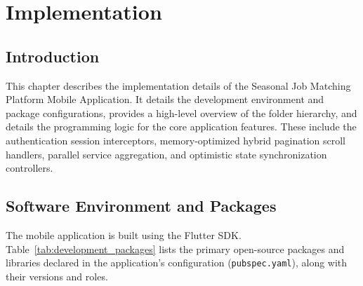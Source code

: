 \chapter{Implementation}
\label{ch:implementation}

\section{Introduction}
This chapter describes the implementation details of the Seasonal Job Matching Platform Mobile Application. It details the development environment and package configurations, provides a high-level overview of the folder hierarchy, and details the programming logic for the core application features. These include the authentication session interceptors, memory-optimized hybrid pagination scroll handlers, parallel service aggregation, and optimistic state synchronization controllers.

\section{Software Environment and Packages}
The mobile application is built using the Flutter SDK. Table~\ref{tab:development_packages} lists the primary open-source packages and libraries declared in the application's configuration (\texttt{pubspec.yaml}), along with their versions and roles.

